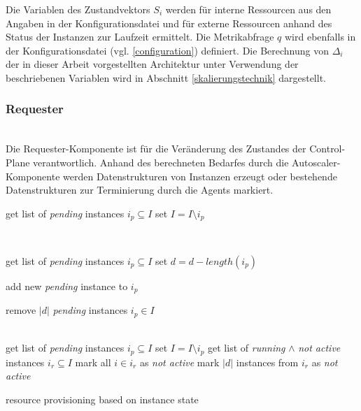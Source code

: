 \documentclass[runningheads]{llncs}
\begin{document}
Die Variablen des Zustandvektors $S_{i}$ werden für interne Ressourcen aus den Angaben in der Konfigurationsdatei und für externe Ressourcen anhand des Status der Instanzen zur Laufzeit ermittelt. Die Metrikabfrage $q$ wird ebenfalls in der Konfigurationsdatei (vgl. \ref{configuration}) definiert. Die Berechnung von $\Delta _{i}$ der in dieser Arbeit vorgestellten Architektur unter Verwendung der beschriebenen Variablen wird in Abschnitt \ref{skalierungstechnik} dargestellt. 
	
\subsubsection{Requester}  \hfill\\

Die Requester-Komponente ist für die Veränderung des Zustandes der Control-Plane verantwortlich. Anhand des berechneten Bedarfes durch die Autoscaler-Komponente werden Datenstrukturen von Instanzen erzeugt oder bestehende Datenstrukturen zur Terminierung durch die Agents markiert.

\begin{algorithm}[H]
	\DontPrintSemicolon
	{
		get list of \textit{pending} instances $i_{p} \subseteq I$ \;
		set $I = I \setminus i_{p}$ \;
	}
	
	\texttt{\\}
	{
		get list of \textit{pending} instances $i_{p} \subseteq I$ \;
		set $d = d - length(i_{p})$ \;
		
		{
			
			{
				add new \textit{pending} instance to  $i_{p}$
			}
			
		}
	
		{
			remove $|d|$ \textit{pending} instances $i_{p} \in I$
		}
	}
	
	\texttt{\\}
	{
		get list of \textit{pending} instances $i_{p} \subseteq I$ \;
		set $I = I \setminus i_{p}$ \;
		get list of \textit{running} $\wedge$ \textit{not active} instances $i_{r} \subseteq I$ \;
		{
			mark all $i \in i_{r}$ as \textit{not active}
		}
		\Else 
		{
			mark $|d|$ instances from $i_{r}$ as \textit{not active}
		}
	}
	
	\caption{resource provisioning based on instance state}
	\label{fig:requester_algorithm}
\end{algorithm}
\end{document}
